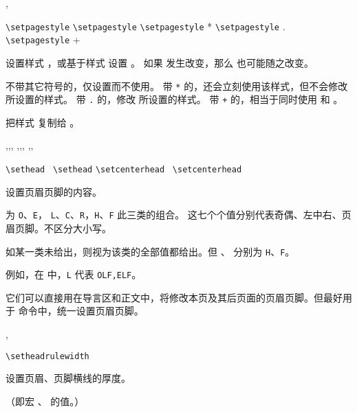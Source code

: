 \documentclass{whudoc}
\begin{document}
\begin{function}{\setpagestyle,\copypagestyle}
  \begin{syntax}
    \verb|\setpagestyle|    
    \verb|\setpagestyle|     
    \verb|\setpagestyle| *   
    \verb|\setpagestyle| .   
    \verb|\setpagestyle| +   
    \V\copypagestyle  {} 
  \end{syntax}
设置样式 ，或基于样式  设置 。
如果  发生改变，那么  也可能随之改变。

不带其它符号的，仅设置而不使用。
带 \verb|*| 的，还会立刻使用该样式，但不会修改  所设置的样式。
带 \verb|.| 的，修改  所设置的样式。
带 \verb|+| 的，相当于同时使用  和 。

 把样式  复制给 。
\end{function}

\begin{function}{\sethead,\setfoot,\setheadfoot,
  \setlefthead,\setcenterhead,\setrighthead,
  \setleftfoot,\setcenterfoot,\setrightfoot}
  \begin{syntax}
    \verb|\sethead|         \,
    \verb|\sethead|  
    \verb|\setcenterhead|           \,
    \verb|\setcenterhead|  
  \end{syntax}
设置页眉页脚的内容。

 为 \texttt{O}、\texttt{E}， \texttt{L}、\texttt{C}、\texttt{R}，\texttt{H}、\texttt{F} 此三类的组合。
这七个个值分别代表奇偶、左中右、页眉页脚。不区分大小写。

如某一类未给出，则视为该类的全部值都给出。但 、 分别为 \texttt{H}、\texttt{F}。

例如，在  中，\verb|L| 代表 \verb|OLF,ELF|。

它们可以直接用在导言区和正文中，将修改本页及其后页面的页眉页脚。但最好用于 
 命令中，统一设置页眉页脚。
\end{function}

\begin{function}{\setheadrulewidth,\setfootrulewidth}
  \begin{syntax}
    \verb|\setheadrulewidth| 
  \end{syntax}
设置页眉、页脚横线的厚度。

（即宏 、 的值。）
\end{function}
\end{document}
